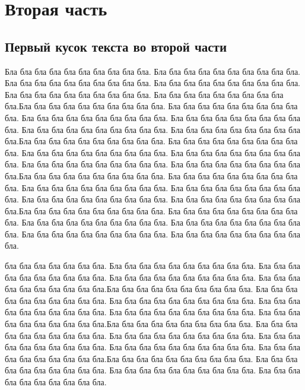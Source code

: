 \documentclass[12pt,a4paper, oneside]{report}
\begin{document}
\section{Вторая часть}
\subsection{Первый кусок текста во второй части}



Бла бла бла бла бла бла бла бла бла бла. Бла бла бла бла бла бла бла бла бла бла. Бла бла бла бла бла бла бла бла бла бла. Бла бла бла бла бла бла бла бла бла бла. Бла бла бла бла бла бла бла бла бла бла. Бла бла бла бла бла бла бла бла бла бла.Бла бла бла бла бла бла бла бла бла бла. Бла бла бла бла бла бла бла бла бла бла. Бла бла бла бла бла бла бла бла бла бла. Бла бла бла бла бла бла бла бла бла бла. Бла бла бла бла бла бла бла бла бла бла. Бла бла бла бла бла бла бла бла бла бла.Бла бла бла бла бла бла бла бла бла бла. Бла бла бла бла бла бла бла бла бла бла. Бла бла бла бла бла бла бла бла бла бла. Бла бла бла бла бла бла бла бла бла бла. Бла бла бла бла бла бла бла бла бла бла. Бла бла бла бла бла бла бла бла бла бла.Бла бла бла бла бла бла бла бла бла бла. Бла бла бла бла бла бла бла бла бла бла. Бла бла бла бла бла бла бла бла бла бла. Бла бла бла бла бла бла бла бла бла бла. Бла бла бла бла бла бла бла бла бла бла. Бла бла бла бла бла бла бла бла бла бла.Бла бла бла бла бла бла бла бла бла бла. Бла бла бла бла бла бла бла бла бла бла. Бла бла бла бла бла бла бла бла бла бла. Бла бла бла бла бла бла бла бла бла бла. Бла бла бла бла бла бла бла бла бла бла. Бла бла бла бла бла бла бла бла бла бла.

бла бла бла бла бла бла бла. Бла бла бла бла бла бла бла бла бла бла. Бла бла бла бла бла бла бла бла бла бла. Бла бла бла бла бла бла бла бла бла бла. Бла бла бла бла бла бла бла бла бла бла.Бла бла бла бла бла бла бла бла бла бла. Бла бла бла бла бла бла бла бла бла бла. Бла бла бла бла бла бла бла бла бла бла. Бла бла бла бла бла бла бла бла бла бла. Бла бла бла бла бла бла бла бла бла бла. Бла бла бла бла бла бла бла бла бла бла.Бла бла бла бла бла бла бла бла бла бла. Бла бла бла бла бла бла бла бла бла бла. Бла бла бла бла бла бла бла бла бла бла. Бла бла бла бла бла бла бла бла бла бла. Бла бла бла бла бла бла бла бла бла бла. Бла бла бла бла бла бла бла бла бла бла.Бла бла бла бла бла бла бла бла бла бла. Бла бла бла бла бла бла бла бла бла бла. Бла бла бла бла бла бла бла бла бла бла. Бла бла бла бла бла бла бла бла бла бла.
\end{document}

